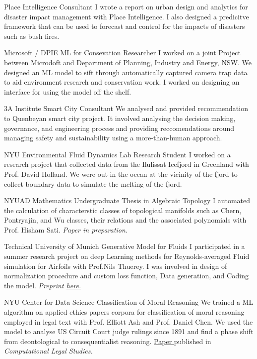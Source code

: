 {Place Intelligence}
{Consultant}
{
	I wrote a report on urban design and analytics for disaster impact management with Place Intelligence. I also designed a predicitve framework that can be used to forecast and control for the impacts of disasters such as bush fires.
}

{Microsoft / DPIE}
{ML for Consevation Researcher}
{
	I worked on a joint Project between Microdoft and Department of Planning, Industry and Energy, NSW. We designed an ML model to sift through automatically captured camera trap data to aid environment research and conservation work. I worked on designing an interface for using the model off the shelf.
}

{3A Institute}
{Smart City Consultant}
{
	We analysed and provided recommendation to Quenbeyan smart city project. It involved analysing the decision making, governance, and engineering process and providing reccomendations around managing safety and sustainability using a more-than-human approach.
}

{NYU Environmental Fluid Dynamics Lab}
{Research Student}
{
	I worked on a research project that collected data from the Ilulissat Icefjord in Greenland with Prof. David Holland. We were out in the ocean at the vicinity of the fjord to collect boundary data to simulate the melting of the fjord.
}

{NYUAD Mathematics}
{Undergraduate Thesis in Algebraic Topology}
{
	I automated the calculation of characterstic classes of topological manifolds such as Chern, Pontryajin, and Wu classes, their relations and the associated polynomials with Prof. Hisham Sati. \textit{Paper in preparation}.
}

{Technical University of Munich}
{Generative Model for Fluids}
{
	I participated in a summer research project on deep Learning methods for Reynolds-averaged Fluid simulation for Airfoils with Prof.Nils Thuerey. I was involved in design of normalization procedure and custom loss function, Data generation, and Coding the model. 
	\textit{ Preprint
		\href{https://www.researchgate.net/publication/328418525_Well_how_accurate_is_it_A_Study_of_Deep_Learning_Methods_for_Reynolds-Averaged_Navier-Stokes_Simulations}{
		here.
		}
	}
}

{NYU Center for Data Science}
{Classification of Moral Reasoning}
{
	We trained a ML algorithm on applied ethics papers corpora for classification of moral reasoning employed in legal text with Prof. Elliott Ash and Prof. Daniel Chen. We used the model to analyse US Circuit Court judge rulings since 1891 and find a phase shift from deontological to consequentialist reasoning.
	\href{https://papers.ssrn.com/sol3/papers.cfm?abstract_id=3205286}{
		Paper
		}published in \textit{Computational Legal Studies.}
}

